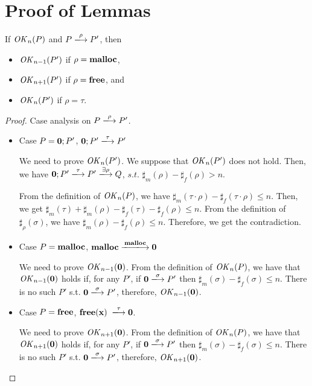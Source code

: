 \section{Proof of Lemmas}
\label{sec:proof}

\begin{lemma}
\label{lem:okPreserved}
If \(\mathit{OK}_n(P)\) and \(P \xlongrightarrow{\rho} P'\), then
\begin{itemize}
\item \(\mathit{OK}_{n-1}(P')\) if \(\rho = \mathbf{malloc}\),
\item \(\mathit{OK}_{n+1}(P')\) if \(\rho = \mathbf{free}\), and
\item \(\mathit{OK}_n(P')\) if \(\rho = \tau\).
\end{itemize}
\end{lemma}
\begin{proof}

Case analysis on \(P \xlongrightarrow{\rho} P'\).

\begin{itemize}
\item Case $P = \mathbf{0};P'$, \Rtab \(\TSKIP;P' \xlongrightarrow{\tau} P'\)

  We need to prove \(\mathit{OK}_n(P')\).   We suppose that
  \(\mathit{OK}_n(P')\) does not hold. Then, we have \(\TSKIP;P'
  \xlongrightarrow{\tau} P' \xlongrightarrow{\exists \rho}
  Q\), \(s.t.\) \(\sharp_{m}(\rho) - \sharp_{f}(\rho) > n\).

  From the definition of \(\mathit{OK}_n(P)\), we have \(\sharp_m(\tau \cdot
  \rho) - \sharp_f(\tau \cdot \rho) \le n \). Then, we get
  \(\sharp_m(\tau) + \sharp_m(\rho) - \sharp_f(\tau) - \sharp_f(\rho)
  \le n\). From the definition of \(\sharp_\rho(\sigma)\), we have
  \(\sharp_m(\rho) - \sharp_f(\rho) \le n\). Therefore, we get the
  contradiction.

\item Case $P = \mathbf{malloc}$, \Rtab \(\Malloc
  \xlongrightarrow{\Malloc} \TSKIP\)

  We need to prove \(\mathit{OK}_{n-1}(\mathbf{0})\).  From the definition of
  \(\mathit{OK}_n(P)\), we have that \(\mathit{OK}_{n-1}(\mathbf{0})\) holds if, for any
  \(P'\), if \(\TSKIP \xlongrightarrow{\sigma} P'\) then
  \(\sharp_m(\sigma) - \sharp_f(\sigma) \le n\). There is no such \(P'\) s.t. \(\TSKIP
  \xlongrightarrow{\sigma} P'\), therefore, \(\mathit{OK}_{n-1}(\mathbf{0})\).

  \item Case $P = \mathbf{free}$, \Rtab \(\FREE \xlongrightarrow{\tau} \TSKIP\).

    We need to prove \(\mathit{OK}_{n+1}(\mathbf{0})\).  From the definition of
  \(\mathit{OK}_n(P)\), we have that \(\mathit{OK}_{n+1}(\mathbf{0})\) holds if, for any
  \(P'\), if \(\TSKIP \xlongrightarrow{\sigma} P'\) then
  \(\sharp_m(\sigma) - \sharp_f(\sigma) \le n\). There is no such \(P'\) s.t. \(\TSKIP
  \xlongrightarrow{\sigma} P'\), therefore, \(\mathit{OK}_{n+1}(\mathbf{0})\).


\end{itemize}
\end{proof}
